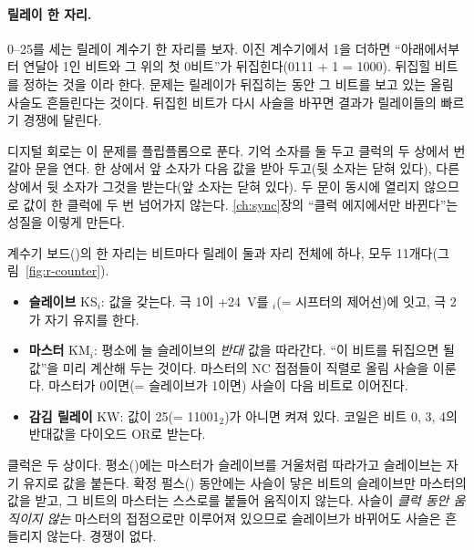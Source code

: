 \paragraph{릴레이 한 자리.} 0--25를 세는 릴레이 계수기 한 자리를 보자. 이진 계수기에서 1을 더하면 ``아래에서부터
연달아 1인 비트와 그 위의 첫 0비트''가 뒤집힌다(0111 + 1 = 1000). 뒤집힐 비트를 정하는 것을 이라 한다. 문제는 릴레이가 뒤집히는 동안 그 비트를 보고 있는 올림 사슬도 흔들린다는 것이다. 뒤집힌 비트가
다시 사슬을 바꾸면 결과가 릴레이들의 빠르기 경쟁에 달린다.

\General 디지털 회로는 이 문제를  플립플롭으로 푼다. 기억 소자를 둘 두고
클럭의 두 상에서 번갈아 문을 연다. 한 상에서 앞 소자가 다음 값을 받아 두고(뒷 소자는 닫혀 있다), 다른
상에서 뒷 소자가 그것을 받는다(앞 소자는 닫혀 있다). 두 문이 동시에 열리지 않으므로 값이 한 클럭에 두 번
넘어가지 않는다. \ref{ch:sync}장의 ``클럭 에지에서만 바뀐다''는 성질을 이렇게 만든다.

\Ours 계수기 보드()의 한 자리는 비트마다 릴레이 둘과 자리 전체에 하나, 모두
11개다(그림~\ref{fig:r-counter}).
\begin{itemize}
\item \textbf{슬레이브} KS$_i$: 값을 갖는다. 극 1이 +24~V를 $_i$(= 시프터의 제어선)에 잇고, 극 2가 자기
유지를 한다.
\item \textbf{마스터} KM$_i$: 평소에 늘 슬레이브의 \emph{반대} 값을 따라간다. ``이 비트를 뒤집으면 될 값''을
미리 계산해 두는 것이다. 마스터의 NC 접점들이 직렬로 올림 사슬을 이룬다. 마스터가 0이면(= 슬레이브가 1이면)
사슬이 다음 비트로 이어진다.
\item \textbf{감김 릴레이} KW: 값이 25(= 11001$_2$)가 아니면 켜져 있다. 코일은 비트 0, 3, 4의 반대값을 다이오드
OR로 받는다.
\end{itemize}
클럭은 두 상이다. 평소()에는 마스터가 슬레이브를 거울처럼 따라가고 슬레이브는 자기 유지로 값을
붙든다. 확정 펄스() 동안에는 사슬이 닿은 비트의 슬레이브만 마스터의 값을 받고, 그 비트의 마스터는
스스로를 붙들어 움직이지 않는다. 사슬이 \emph{클럭 동안 움직이지 않는} 마스터의 접점으로만 이루어져 있으므로
슬레이브가 바뀌어도 사슬은 흔들리지 않는다. 경쟁이 없다.

